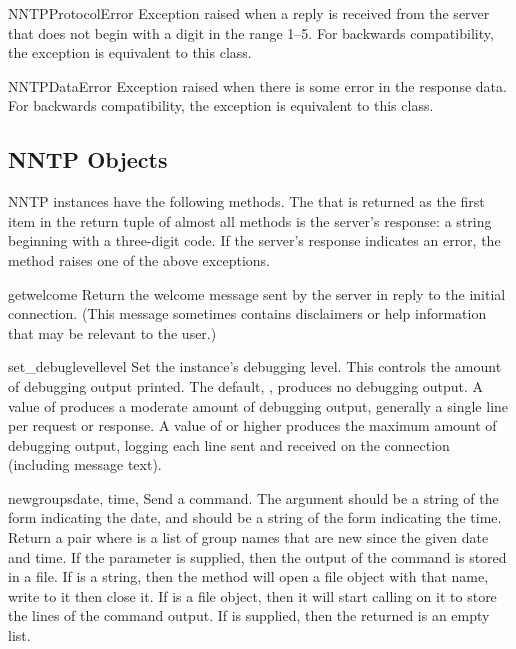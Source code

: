 \begin{classdesc}{NNTPProtocolError}{}
Exception raised when a reply is received from the server that does
not begin with a digit in the range 1--5.  For backwards
compatibility, the exception  is equivalent to this
class.
\end{classdesc}

\begin{classdesc}{NNTPDataError}{}
Exception raised when there is some error in the response data.  For
backwards compatibility, the exception  is
equivalent to this class.
\end{classdesc}


\subsection{NNTP Objects \label{nntp-objects}}

NNTP instances have the following methods.  The  that is
returned as the first item in the return tuple of almost all methods
is the server's response: a string beginning with a three-digit code.
If the server's response indicates an error, the method raises one of
the above exceptions.


\begin{methoddesc}{getwelcome}{}
Return the welcome message sent by the server in reply to the initial
connection.  (This message sometimes contains disclaimers or help
information that may be relevant to the user.)
\end{methoddesc}

\begin{methoddesc}{set_debuglevel}{level}
Set the instance's debugging level.  This controls the amount of
debugging output printed.  The default, , produces no debugging
output.  A value of  produces a moderate amount of debugging
output, generally a single line per request or response.  A value of
 or higher produces the maximum amount of debugging output,
logging each line sent and received on the connection (including
message text).
\end{methoddesc}

\begin{methoddesc}{newgroups}{date, time, }
Send a  command.  The  argument should be a
string of the form  indicating the
date, and  should be a string of the form
 indicating the time.  Return a pair
 where  is a list of
group names that are new since the given date and time.
If the  parameter is supplied, then the output of the 
 command is stored in a file.  If  is a string, 
then the method will open a file object with that name, write to it 
then close it.  If  is a file object, then it will start
calling  on it to store the lines of the command output.
If  is supplied, then the returned  is an empty list.
\end{methoddesc}

